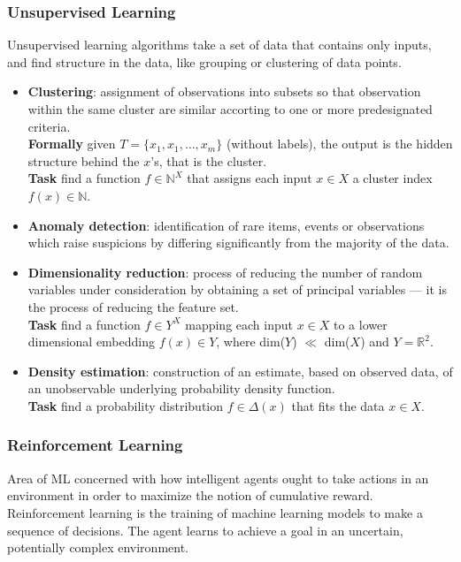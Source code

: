 \documentclass[a4paper,6pt,twocolumn,fleqn]{article}
\begin{document}
\subsubsection{Unsupervised Learning} %
Unsupervised learning algorithms take a set of data that contains only inputs, and find structure in the data, like grouping or clustering of data points.
\begin{itemize}
    \item \textbf{Clustering}: assignment of observations into subsets so that observation within the same cluster are similar accorting to one or more predesignated criteria.\\
    \textbf{Formally} given \(T = \{x_1, x_1, \ldots, x_m\}\) (without labels), the output is the hidden structure behind the \(x\)'s, that is the cluster.\\
    \textbf{Task} find a function \(f \in \mathbb N^X\) that assigns each input \(x \in X\) a cluster index \(f(x) \in \mathbb N\).
    \item \textbf{Anomaly detection}: identification of rare items, events or observations which raise suspicions by differing significantly from the majority of the data.
    \item \textbf{Dimensionality reduction}: process of reducing the number of random variables under consideration by obtaining a set of principal variables --- it is the process of reducing the feature set.\\
    \textbf{Task} find a function \(f \in Y^X\) mapping each input \(x \in X\) to a lower dimensional embedding \(f(x) \in Y\), where dim(\(Y\)) \(\ll\) dim(\(X\)) and \(Y = \mathbb R^2\).
    \item \textbf{Density estimation}: construction of an estimate, based on observed data, of an unobservable underlying probability density function.\\
    \textbf{Task} find a probability distribution \(f \in \Delta(x)\) that fits the data \(x \in X\).
\end{itemize}
\subsubsection{Reinforcement Learning} %
Area of ML concerned with how intelligent agents ought to take actions in an environment in order to maximize the notion of cumulative reward. Reinforcement learning is the training of machine learning models to make a sequence of decisions. The agent learns to achieve a goal in an uncertain, potentially complex environment.
\end{document}
